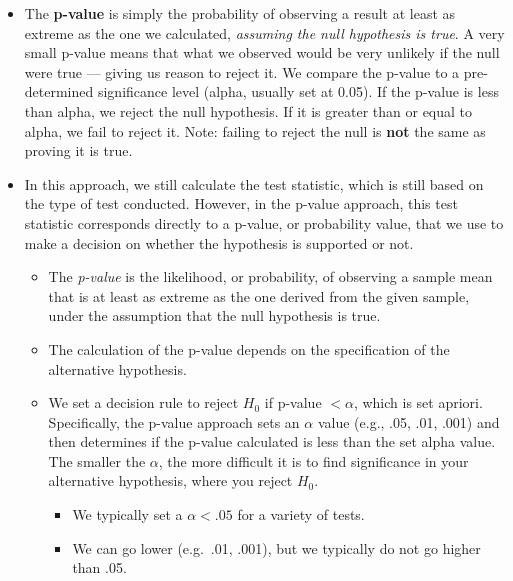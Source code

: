 \documentclass[
  letterpaper,
  DIV=11,
  numbers=noendperiod]{scrreprt}
\providecommand{\tightlist}{%
  \setlength{\itemsep}{0pt}\setlength{\parskip}{0pt}}\usepackage{longtable,booktabs,array}
\begin{document}
\begin{itemize}
\item
  The \textbf{p-value} is simply the probability of observing a result
  at least as extreme as the one we calculated, \emph{assuming the null
  hypothesis is true}. A very small p-value means that what we observed
  would be very unlikely if the null were true --- giving us reason to
  reject it. We compare the p-value to a pre-determined significance
  level (alpha, usually set at 0.05). If the p-value is less than alpha,
  we reject the null hypothesis. If it is greater than or equal to
  alpha, we fail to reject it. Note: failing to reject the null is
  \textbf{not} the same as proving it is true.
\item
  In this approach, we still calculate the test statistic, which is
  still based on the type of test conducted. However, in the p-value
  approach, this test statistic corresponds directly to a p-value, or
  probability value, that we use to make a decision on whether the
  hypothesis is supported or not.

  \begin{itemize}
  \tightlist
  \item
    The \emph{p-value} is the likelihood, or probability, of observing a
    sample mean that is at least as extreme as the one derived from the
    given sample, under the assumption that the null hypothesis is true.
  \item
    The calculation of the p-value depends on the specification of the
    alternative hypothesis.
  \item
    We set a decision rule to reject \(H_0\) if p-value \(< \alpha\),
    which is set apriori. Specifically, the p-value approach sets an
    \(\alpha\) value (e.g., .05, .01, .001) and then determines if the
    p-value calculated is less than the set alpha value. The smaller the
    \(\alpha\), the more difficult it is to find significance in your
    alternative hypothesis, where you reject \(H_0\).

    \begin{itemize}
    \tightlist
    \item
      We typically set a \(\alpha < .05\) for a variety of tests.
    \item
      We can go lower (e.g.~.01, .001), but we typically do not go
      higher than .05.
    \end{itemize}
  \end{itemize}
\end{itemize}
\end{document}
